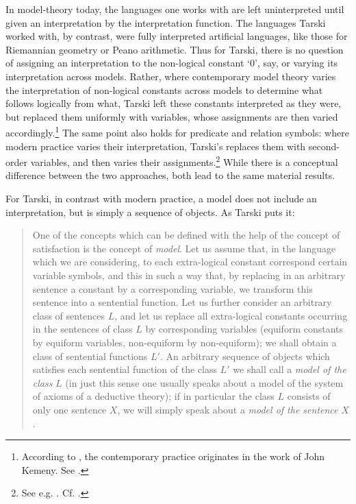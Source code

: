 \documentclass[]{article}
\begin{document}
In model-theory today, the languages one works with are left uninterpreted until given an interpretation by the interpretation function. The languages Tarski worked with, by contrast, were fully interpreted artificial languages, like those for Riemannian geometry or Peano arithmetic. Thus for Tarski, there is no question of assigning an interpretation to the non-logical constant `0', say, or varying its interpretation across models. Rather, where contemporary model theory varies the interpretation of non-logical constants across models to determine what follows logically from what, Tarski left these constants interpreted as they were, but replaced them uniformly with variables, whose assignments are then varied accordingly.\footnote{According to \autocite[433]{Schiemer2013}, the contemporary practice originates in the work of John Kemeny. See \autocite{Kemeny1956} \autocite{Kemeny1956b}.} The same point also holds for predicate and relation symbols: where modern practice varies their interpretation, Tarski's replaces them with second-order variables, and then varies their assignments.\footnote{See e.g. \autocite[122-23]{Tarski1941}. Cf. \autocite[69]{Etchemendy1988} \autocite[448]{Schiemer2013}.} While there is a conceptual difference between the two approaches, both lead to the same material results.


For Tarski, in contrast with modern practice, a model does not include an interpretation, but is simply a sequence of objects. As Tarski puts it:
\begin{quote}
	One of the concepts which can be defined with the help of the concept of satisfaction is the concept of \textit{model}. Let us assume that, in the language which we are considering, to each extra-logical constant correspond certain variable symbols, and this in such a way that, by replacing in an arbitrary sentence a constant by a corresponding variable, we transform this sentence into a sentential function. Let us further consider an arbitrary class of sentences $L$, and let us replace all extra-logical constants occurring in the sentences of class $L$ by corresponding variables (equiform constants by equiform variables, non-equiform by non-equiform); we shall obtain a class of sentential functions $L'$. An arbitrary sequence of objects which satisfies each sentential function of the class $L'$ we shall call a \textit{model of the class} $L$ (in just this sense one usually speaks about a model of the system of axioms of a deductive theory); if in particular the class $L$ consists of only one sentence $X$, we will simply speak about a \textit{model of the sentence} $X$ \autocite[185-186]{Tarski2002}.
\end{quote}
\end{document}

